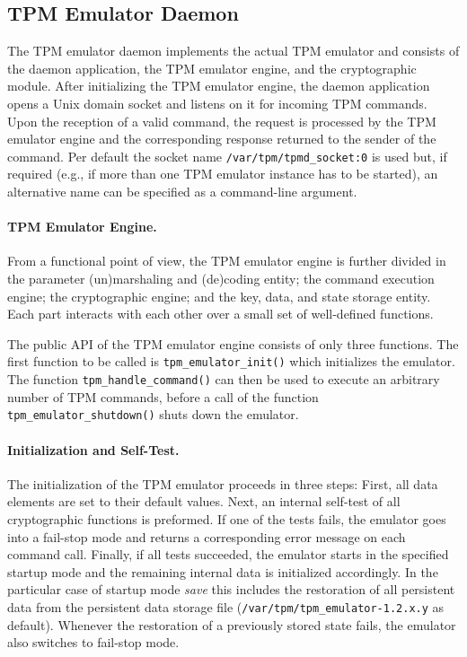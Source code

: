 \documentclass[runningheads]{llncs}
\newcommand{\file}[1]{\small\texttt{#1}\normalsize}
\newcommand{\func}[1]{\small\texttt{#1}\normalsize}
\begin{document}
\subsection{TPM Emulator Daemon}
The TPM emulator daemon implements the actual TPM emulator and consists of
the daemon application, the TPM emulator engine, and the cryptographic module.
After initializing the TPM emulator engine, the daemon application opens a
Unix domain socket and listens on it for incoming TPM commands. Upon the
reception of a valid command, the request is processed by the TPM emulator
engine and the corresponding response returned to the sender of the command.
Per default the socket name \file{/var/tpm/tpmd\_socket:0} is used but, if
required (e.g., if more than one TPM emulator instance has to be started),
an alternative name can be specified as a command-line argument.

\paragraph{TPM Emulator Engine.}
From a functional point of view, the TPM emulator engine is further divided
in the parameter (un)marshaling and (de)coding entity; the command execution
engine; the cryptographic engine; and the key, data, and state storage entity.
Each part interacts with each other over a small set of well-defined functions.

The public API of the TPM emulator engine consists of only three functions.
The first function to be called is \func{tpm\_emulator\_init()} which
initializes the emulator. The function \func{tpm\_\-handle\_\-command()} can
then be used to execute an arbitrary number of TPM commands, before a call of
the function \func{tpm\_emulator\_shutdown()} shuts down the emulator.

\paragraph{Initialization and Self-Test.}
The initialization of the TPM emulator proceeds in three steps:
First, all data elements are set to their default values.
Next, an internal self-test of all cryptographic functions
is preformed. If one of the tests fails, the emulator goes into a fail-stop
mode and returns a corresponding error message on each command call. Finally,
if all tests succeeded, the emulator starts in the specified startup mode and
the remaining internal data is initialized accordingly. In the particular case
of startup mode \emph{save} this includes the restoration of all persistent
data from the persistent data storage file
(\file{/var/tpm/tpm\_emulator-1.2.x.y} as default).
Whenever the restoration of a previously stored state fails, the emulator
also switches to fail-stop mode.
\end{document}
